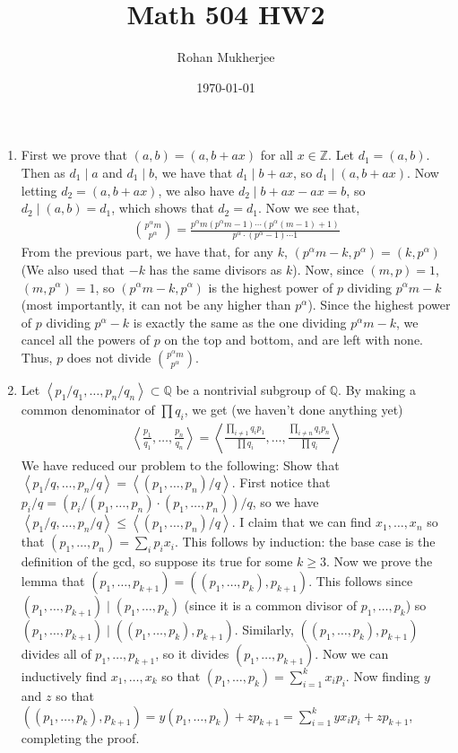 \documentclass[12pt]{article}
\title{Math 504 HW2}
\date{\today}
\author{Rohan Mukherjee}
\theoremstyle{definitionstyle}
\def\mbb#1{\mathbb{#1}}
\newcommand{\Z}{\mbb Z}
\newcommand{\gen}[1]{\left\langle #1 \right\rangle}
\begin{document}
	\maketitle
	\begin{enumerate}[leftmargin=\labelsep]
		\item First we prove that $(a, b) = (a, b+ax)$ for all $x \in \Z$. Let $d_1 = (a, b)$. Then as $d_1 \mid a$ and $d_1 \mid b$, we have that $d_1 \mid b+ax$, so $d_1 \mid (a, b+ax)$. Now letting $d_2 = (a, b+ax)$, we also have $d_2 \mid b + ax - ax = b$, so $d_2 \mid (a, b) = d_1$, which shows that $d_2 = d_1$. Now we see that,
		\begin{align*}
			{p^\alpha m \choose p^\alpha} = \frac{p^\alpha m(p^\alpha m - 1) \cdots (p^\alpha (m-1) + 1)}{p^\alpha \cdot (p^\alpha - 1) \cdots 1}
		\end{align*}
		From the previous part, we have that, for any $k$, $(p^\alpha m - k, p^\alpha) = (k, p^\alpha)$ (We also used that $-k$ has the same divisors as $k$). Now, since $(m, p) = 1$, $(m, p^\alpha) = 1$, so $(p^\alpha m - k, p^\alpha)$ is the highest power of $p$ dividing $p^\alpha m - k$ (most importantly, it can not be any higher than $p^\alpha$). Since the highest power of $p$ dividing $p^\alpha - k$ is exactly the same as the one dividing $p^\alpha m - k$, we cancel all the powers of $p$ on the top and bottom, and are left with none. Thus, $p$ does not divide ${p^\alpha m \choose p^\alpha}$.
		
		\item Let $\gen{p_1/q_1, \ldots, p_n/q_n} \subset \mbb Q$ be a nontrivial subgroup of $\mbb Q$. By making a common denominator of $\prod q_i$, we get (we haven't done anything yet)
		\begin{align*}
			\gen{\frac{p_1}{q_1}, \ldots, \frac{p_n}{q_n}} = \gen{\frac{\prod_{i \neq 1} q_ip_1}{\prod q_i}, \ldots, \frac{\prod_{i \neq n}q_i p_n}{\prod q_i}}
		\end{align*}
		We have reduced our problem to the following: Show that $\gen{p_1/q, \ldots, p_n/q} = \gen{(p_1, \ldots, p_n)/q}$. First notice that $p_i/q = (p_i/(p_1, \ldots, p_n) \cdot (p_1, \ldots, p_n)) / q$, so we have $\gen{p_1/q, \ldots, p_n/q} \leq \gen{(p_1, \ldots, p_n)/q}$. I claim that we can find $x_1, \ldots, x_n$ so that $(p_1, \ldots, p_n) = \sum_i p_ix_i$. This follows by induction: the base case is the definition of the gcd, so suppose its true for some $k \geq 3$. Now we prove the lemma that $(p_1, \ldots, p_{k+1}) = ((p_1, \ldots, p_k), p_{k+1})$. This follows since $(p_1, \ldots, p_{k+1}) \mid (p_1, \ldots, p_k)$ (since it is a common divisor of $p_1, \ldots, p_k$) so $(p_1, \ldots, p_{k+1}) \mid ((p_1, \ldots, p_k), p_{k+1})$. Similarly, $((p_1, \ldots, p_k), p_{k+1})$ divides all of $p_1, \ldots, p_{k+1}$, so it divides $(p_1, \ldots, p_{k+1})$. Now we can inductively find $x_1, \ldots, x_k$ so that $(p_1, \ldots, p_k) = \sum_{i=1}^k x_ip_i$. Now finding $y$ and $z$ so that $((p_1, \ldots, p_k), p_{k+1}) = y(p_1, \ldots, p_k) + zp_{k+1} = \sum_{i=1}^k yx_ip_i + zp_{k+1}$, completing the proof.
		

\end{enumerate}
\end{document}
